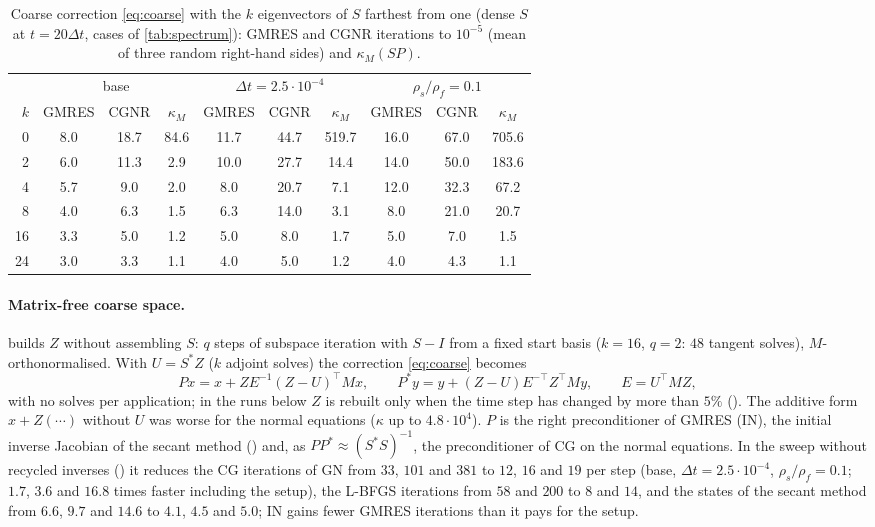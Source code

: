 \documentclass[11pt,a4paper]{article}
\theoremstyle{definition}
\theoremstyle{remark}
\newcommand{\M}{M}
\begin{document}
\begin{table}[ht]\centering
\caption{Coarse correction \eqref{eq:coarse} with the $k$ eigenvectors of $S$ farthest from one
(dense $S$ at $t=20\Delta t$, cases of \cref{tab:spectrum}): GMRES and CGNR iterations to $10^{-5}$
(mean of three random right-hand sides) and $\kappa_{\M}(SP)$.}\label{tab:coarse_offline}
\begin{tabular}{r|ccc|ccc|ccc}
\toprule
& \multicolumn{3}{c|}{base} & \multicolumn{3}{c|}{$\Delta t=2.5\cdot10^{-4}$} & \multicolumn{3}{c}{$\rho_s/\rho_f=0.1$}\\
$k$ & GMRES & CGNR & $\kappa_{\M}$ & GMRES & CGNR & $\kappa_{\M}$ & GMRES & CGNR & $\kappa_{\M}$\\
\midrule
0 & 8.0 & 18.7 & 84.6 & 11.7 & 44.7 & 519.7 & 16.0 & 67.0 & 705.6\\
2 & 6.0 & 11.3 & 2.9 & 10.0 & 27.7 & 14.4 & 14.0 & 50.0 & 183.6\\
4 & 5.7 & 9.0 & 2.0 & 8.0 & 20.7 & 7.1 & 12.0 & 32.3 & 67.2\\
8 & 4.0 & 6.3 & 1.5 & 6.3 & 14.0 & 3.1 & 8.0 & 21.0 & 20.7\\
16 & 3.3 & 5.0 & 1.2 & 5.0 & 8.0 & 1.7 & 5.0 & 7.0 & 1.5\\
24 & 3.0 & 3.3 & 1.1 & 4.0 & 5.0 & 1.2 & 4.0 & 4.3 & 1.1\\
\bottomrule
\end{tabular}
\end{table}

\paragraph{Matrix-free coarse space.}  builds $Z$ without
assembling $S$: $q$ steps of subspace iteration with $S-I$ from a fixed start basis
($k=16$, $q=2$: $48$ tangent solves), $\M$-orthonormalised. With $U=S^*Z$ ($k$ adjoint solves)
the correction \eqref{eq:coarse} becomes
\begin{equation}\label{eq:coarse_mf}
  Px=x+ZE^{-1}(Z-U)^{\top}\M x,\qquad P^*y=y+(Z-U)E^{-\top}Z^{\top}\M y,\qquad E=U^{\top}\M Z,
\end{equation}
with no solves per application; in the runs below $Z$ is rebuilt only when the time step has
changed by more than $5\%$ (). The
additive form $x+Z(\cdots)$ without $U$ was worse for the normal equations ($\kappa$ up to
$4.8\cdot10^4$). $P$ is the right preconditioner of GMRES (IN), the initial inverse Jacobian of the
secant method () and, as $PP^*\approx(S^*S)^{-1}$, the
preconditioner of CG on the normal equations. In the sweep without recycled inverses
() it reduces the CG iterations of GN from $33$, $101$ and $381$ to $12$, $16$
and $19$ per step (base, $\Delta t=2.5\cdot10^{-4}$, $\rho_s/\rho_f=0.1$; $1.7$, $3.6$ and $16.8$
times faster including the setup), the L-BFGS iterations from $58$ and $200$ to $8$ and $14$, and
the states of the secant method from $6.6$, $9.7$ and $14.6$ to $4.1$, $4.5$ and $5.0$; IN gains
fewer GMRES iterations than it pays for the setup.
\end{document}

